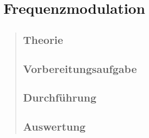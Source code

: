 \section{Frequenzmodulation}
\begin{quote}
    \subsection{Theorie}
    \begin{quote}
        
    \end{quote}
    
    \subsection{Vorbereitungsaufgabe}
    \begin{quote}
     
    \end{quote}
    
    \subsection{Durchführung}
    \begin{quote}
        
    \end{quote}
    
    \subsection{Auswertung}
    \begin{quote}
        
    \end{quote}	
\end{quote}




